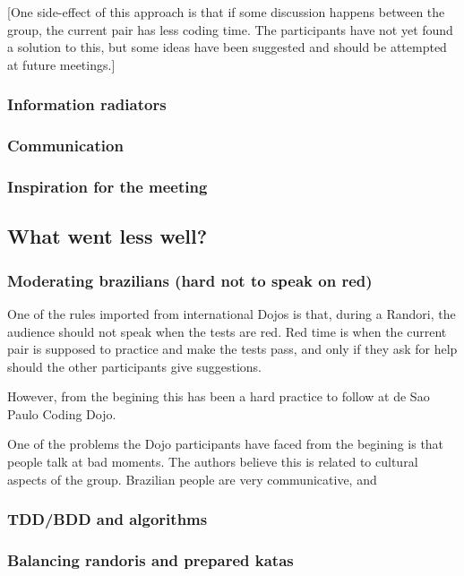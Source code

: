 [One side-effect of this approach is that if some discussion happens
between the group, the current pair has less coding time. The
participants have not yet found a solution to this, but some ideas
have been suggested and should be attempted at future meetings.]

\subsubsection{Information radiators}

\subsubsection{Communication}

\subsubsection{Inspiration for the meeting}

\subsection{What went less well?}\label{ssub:less_well}

\subsubsection{Moderating brazilians (hard not to speak on red)}

One of the rules imported from international Dojos is that, during a
Randori, the audience should not speak when the tests are red. Red
time is when the current pair is supposed to practice and make the
tests pass, and only if they ask for help should the other
participants give suggestions.

However, from the begining this has been a hard practice to follow at
de Sao Paulo Coding Dojo.

One of the problems the Dojo participants have faced from the begining
is that people talk at bad moments. The authors believe this is
related to cultural aspects of the group. Brazilian people are very
communicative, and 

\subsubsection{TDD/BDD and algorithms}

\subsubsection{Balancing randoris and prepared katas}

